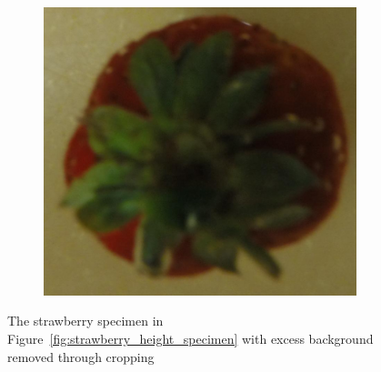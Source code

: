 \documentclass {udthesis}
\begin{document}
\begin{figure}
\begin{subfigure}[]{0.12\textwidth}
      \caption{}
  \end{subfigure}
  \begin{subfigure}[]{0.12\textwidth}
      \includegraphics[width=\textwidth]{strawberry4_obj_01/strawberry4_001_08}
      \caption{}
  \end{subfigure}
\caption[Images of a strawberry specimen after cropping excess background]{The strawberry specimen in Figure~\ref{fig:strawberry_height_specimen} with excess background removed through cropping}
\label{fig:strawberry_height_specimen_cropped}
\end{figure}	
\end{document}
